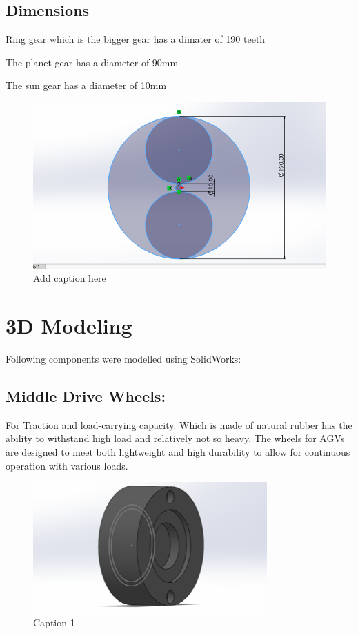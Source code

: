 \documentclass[../../main]{subfiles}
\begin{document}
\subsection{Dimensions}

Ring gear which is the bigger gear has a dimater of 190 teeth

The planet gear has a diameter of 90mm

The sun gear has a diameter of 10mm
\begin{figure}[h]
  \centering
\includegraphics[width=\textwidth]{sublatex/Opryrmi/media/image1.png}
\caption{Add caption here}
\end{figure}

\newpage
\section{3D Modeling}

Following components were modelled using SolidWorks:



  \subsection{Middle Drive Wheels:}
  For Traction and load-carrying capacity. Which is
  made of natural rubber has the ability to withstand high load and
  relatively not so heavy. The wheels for AGVs are designed to meet both
  lightweight and high durability to allow for continuous operation with
  various loads.
  \begin{figure}[h]
    \centering
    \includegraphics[width=0.8\textwidth]{sublatex/Opryrmi/media/image2.png} 
    \caption{Caption 1}
  \end{figure}
\end{document}
